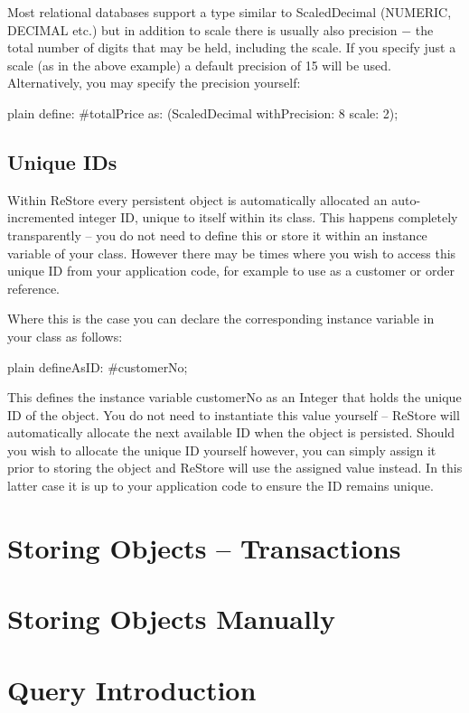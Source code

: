 \documentclass[10pt,twoside,english]{_support/latex/sbabook/sbabook}
\begin{document}
Most relational databases support a type similar to ScaledDecimal (NUMERIC, DECIMAL etc.) but in addition to scale there is usually also precision − the total number of digits that may be held, including the scale. If you specify just a scale (as in the above example) a default precision of 15 will be used. Alternatively, you may specify the precision yourself: 

\begin{displaycode}{plain}
	define: #totalPrice as: (ScaledDecimal withPrecision: 8 scale: 2);
\end{displaycode}
\section{Unique IDs}
Within ReStore every persistent object is automatically allocated an auto-incremented integer ID, unique to itself within its class. This happens completely transparently – you do not need to define this or store it within an instance variable of your class. However there may be times where you wish to access this unique ID from your application code, for example to use as a customer or order reference.

Where this is the case you can declare the corresponding instance variable in your class as follows:

\begin{displaycode}{plain}
	defineAsID: #customerNo;
\end{displaycode}

This defines the instance variable customerNo as an Integer that holds the unique ID of the object. You do not need to instantiate this value yourself – ReStore will automatically allocate the next available ID when the object is persisted. Should you wish to allocate the unique ID yourself however, you can simply assign it prior to storing the object and ReStore will use the assigned value instead. In this latter case it is up to your application code to ensure the ID remains unique.
 

\chapter{Storing Objects – Transactions}
\chapter{Storing Objects Manually}
\chapter{Query Introduction}






\backmatter

\end{document}
